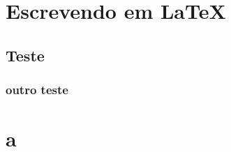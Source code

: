 \chapter{Escrevendo em \LaTeX}

\lipsum


\section{Teste}

\lipsum

\subsection{outro teste}

\lipsum

\chapter{a}